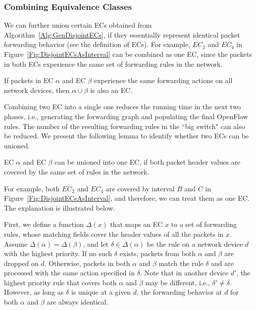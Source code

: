\subsubsection{Combining Equivalence Classes}
We can further union certain ECs obtained from Algorithm~\ref{Alg:GenDisjointECs}, if they essentially represent identical packet forwarding behavior (see the definition of ECs). For example, $EC_2$ and $EC_4$ in Figure~\ref{Fig:DisjointECsAsInterval} can be combined as one EC, since the packets in both ECs experience the same set of forwarding rules in the network. %

\begin{lemma}
If packets in EC $\alpha$ and EC $\beta$ experience the same forwarding actions on all network devices, then $\alpha \cup \beta$ is also an EC.
\label{Lemma:MergeFG}
\end{lemma}
Combining two EC into a single one reduces the running time in the next two phases, i.e., generating the forwarding graph and populating the final OpenFlow rules. The number of the resulting forwarding rules in the ``big switch" can also be reduced. We present the following lemma to identify whether two ECs can be unioned.

\begin{lemma}
EC $\alpha$ and EC $\beta$ can be unioned into one EC, if both packet header values are covered by the same set of rules in the network.
\label{Lemma:MergeEC}
\end{lemma}
For example, both $EC_2$ and $EC_4$ are covered by interval $B$ and $C$ in Figure~\ref{Fig:DisjointECsAsInterval}, and therefore, we can treat them as one EC. The explanation is illustrated below.

First, we define a function $\Delta(x)$ that maps an EC $x$ to a set of forwarding rules, whose matching fields cover the header values of all the packets in $x$. Assume $\Delta(\alpha) = \Delta(\beta)$, and let $\delta \in \Delta(\alpha)$ be the rule on a network device $d$ with the highest priority.
If no such $\delta$ exists, packets from both $\alpha$ and $\beta$ are dropped on $d$.
Otherwise, packets in both $\alpha$ and $\beta$ match the rule $\delta$ and are processed with the same action specified in $\delta$.
Note that in another device $d'$, the highest priority rule that covers both $\alpha$
and $\beta$ may be different, i.e., $\delta' \neq \delta$.
However, as long as $\delta$ is unique at a given $d$, the forwarding behavior at $d$ for both $\alpha$ and $\beta$ are always identical.

